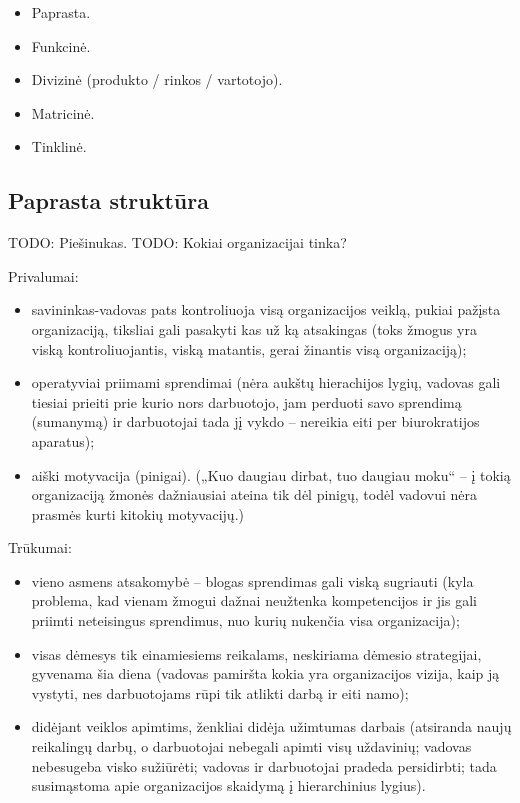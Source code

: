 \begin{itemize}
  \item Paprasta.
  \item Funkcinė.
  \item Divizinė (produkto / rinkos / vartotojo).
  \item Matricinė.
  \item Tinklinė.
\end{itemize}

\subsection{Paprasta struktūra}

TODO: Piešinukas.
TODO: Kokiai organizacijai tinka?

Privalumai:
\begin{itemize}
  \item savininkas-vadovas pats kontroliuoja visą organizacijos veiklą,
    pukiai pažįsta organizaciją, tiksliai gali pasakyti kas už ką
    atsakingas (toks žmogus yra viską kontroliuojantis, viską matantis,
    gerai žinantis visą organizaciją);
  \item operatyviai priimami sprendimai (nėra aukštų hierachijos lygių,
    vadovas gali tiesiai prieiti prie kurio nors darbuotojo, jam
    perduoti savo sprendimą (sumanymą) ir darbuotojai tada jį vykdo –
    nereikia eiti per biurokratijos aparatus);
  \item aiški motyvacija (pinigai). („Kuo daugiau dirbat, tuo daugiau
    moku“ – į tokią organizaciją žmonės dažniausiai ateina tik dėl
    pinigų, todėl vadovui nėra prasmės kurti kitokių motyvacijų.)
\end{itemize}

Trūkumai:
\begin{itemize}
  \item vieno asmens atsakomybė – blogas sprendimas gali viską sugriauti
    (kyla problema, kad vienam žmogui dažnai neužtenka kompetencijos
    ir jis gali priimti neteisingus sprendimus, nuo kurių nukenčia
    visa organizacija);
  \item visas dėmesys tik einamiesiems reikalams, neskiriama dėmesio
    strategijai, gyvenama šia diena (vadovas pamiršta kokia yra
    organizacijos vizija, kaip ją vystyti, nes darbuotojams rūpi tik
    atlikti darbą ir eiti namo);
  \item didėjant veiklos apimtims, ženkliai didėja užimtumas darbais
    (atsiranda naujų reikalingų darbų, o darbuotojai nebegali apimti
    visų uždavinių; vadovas nebesugeba visko sužiūrėti; vadovas ir
    darbuotojai pradeda persidirbti; tada susimąstoma apie organizacijos
    skaidymą į hierarchinius lygius).
\end{itemize}

